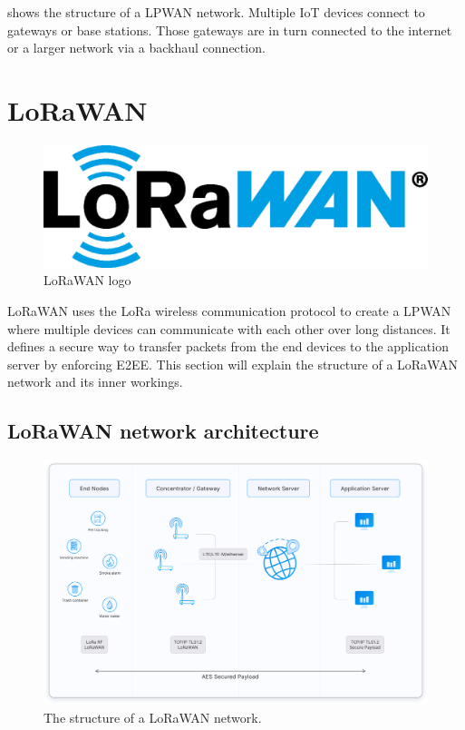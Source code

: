  shows the structure of a \ac{LPWAN} network.
Multiple \ac{IoT} devices connect to gateways or base stations.
Those gateways are in turn connected to the internet or a larger network via a backhaul connection.

\section{\acf{LoRaWAN}}\label{sec:lorawan}

\begin{figure}[htbp]
    \centering
    \includegraphics[width=.3\textwidth]{pictures/logos/LoRaWAN_Logo.eps}
    \caption{
        \ac{LoRaWAN} logo~\protect\cite{lora_alliance_francais_2022}
    }
\end{figure}

\ac{LoRaWAN} uses the \ac{LoRa} wireless communication protocol to create a \ac{LPWAN} where multiple devices can communicate with each other over long distances.
It defines a secure way to transfer packets from the end devices to the application server by enforcing \ac{E2EE}.
This section will explain the structure of a \ac{LoRaWAN} network and its inner workings.

\subsection{\acs{LoRaWAN} network architecture}

\begin{figure}[htbp]
    \centering
    \includegraphics[width=1\textwidth]{pictures/lorawan-structure/lorawan-architecture.png}
    \caption{
        The structure of a \ac{LoRaWAN} network.~\protect\cite{the_things_industries_bv_lorawan_nodate}
    }\label{pic:lorawan-network-structure}
\end{figure}

